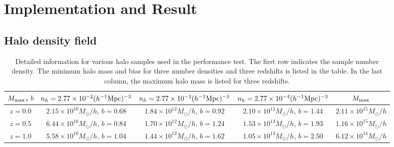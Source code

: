 \documentclass[iop]{emulateapj}
\newcommand{\mpch}{h^{-1} {\rm Mpc}}
\newcommand{\Msun}{M_{\odot}}
\begin{document}
{%


\section{Implementation and Result}
\label{sec:result}

\subsection{Halo density field}
\label{sec:massassign}

\begin{table*}
\begin{tabular}{c|c|c|c||c}
\hline\hline
$M_{\rm max}$, $b$ & $n_h=2.77\times 10^{-2} (\mpch)^{-3}$ & $n_h=2.77\times 10^{-3} (\mpch)^{-3}$ & $n_h=2.77\times 10^{-4} (\mpch)^{-3}$ & $M_{\rm max}$\\
\hline
$z=0.0$    & $2.15\times 10^{10} \Msun/h$, $b=0.68$ & $1.84\times 10^{12} \Msun/h$, $b=0.92$ & $2.10\times 10^{13} \Msun/h$, $b=1.44$ & $2.11\times 10^{15} \Msun/h$\\ 
$z=0.5$ & $6.44\times 10^{10} \Msun/h$, $b=0.84$ & $1.70\times 10^{12} \Msun/h$, $b=1.24$ & $1.53\times 10^{13} \Msun/h$, $b=1.93$ & $1.16\times 10^{15} \Msun/h$\\  
$z=1.0$    & $5.58\times 10^{10} \Msun/h$, $b=1.04$ & $1.44\times 10^{12} \Msun/h$, $b=1.62$ & $1.05\times 10^{13} \Msun/h$, $b=2.50$ & $6.12\times 10^{14} \Msun/h$\\     
\hline\hline
\end{tabular}
\caption{Detailed information for various halo samples used in the performance test.
The first row indicates the sample number density.
The minimum halo mass and bias for three number densities and  three redshifts is listed in the table.
In the last column, the maximum halo mass is listed for three redshifts.}
\label{tab:haloinfo}
\end{table*}

}
\end{document}
